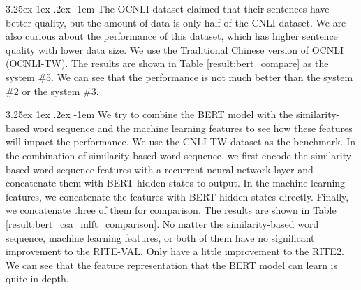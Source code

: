 \documentclass[12pt]{article}
\makeatletter
\renewcommand\paragraph{\@startsection{paragraph}{5}{\z@}%
  {3.25ex \@plus1ex \@minus.2ex}%
  {-1em}%
  {\normalfont\normalsize\bfseries}}
\makeatother
\begin{document}
\begin{CJK*}{UTF8}{bkai}
\begin{spacing}{1.77}
\paragraph{}
The OCNLI dataset claimed that their sentences have better quality, but the amount of data is only half of the CNLI dataset. We are also curious about the performance of this dataset, which has higher sentence quality with lower data size. We use the Traditional Chinese version of OCNLI (OCNLI-TW). The results are shown in Table \ref{result:bert_compare} as the system \#5. We can see that the performance is not much better than the system \#2 or the system \#3.

\paragraph{}
We try to combine the BERT model with the similarity-based word sequence and the machine learning features to see how these features will impact the performance. We use the CNLI-TW dataset as the benchmark. In the combination of similarity-based word sequence, we first encode the similarity-based word sequence features with a recurrent neural network layer and concatenate them with BERT hidden states to output. In the machine learning features, we concatenate the features with BERT hidden states directly. Finally, we concatenate three of them for comparison. The results are shown in Table \ref{result:bert_csa_mlft_comparison}. No matter the similarity-based word sequence, machine learning features, or both of them have no significant improvement to the RITE-VAL. Only have a little improvement to the RITE2. We can see that the feature representation that the BERT model can learn is quite in-depth.


\end{spacing}
\end{CJK*}
\end{document}
